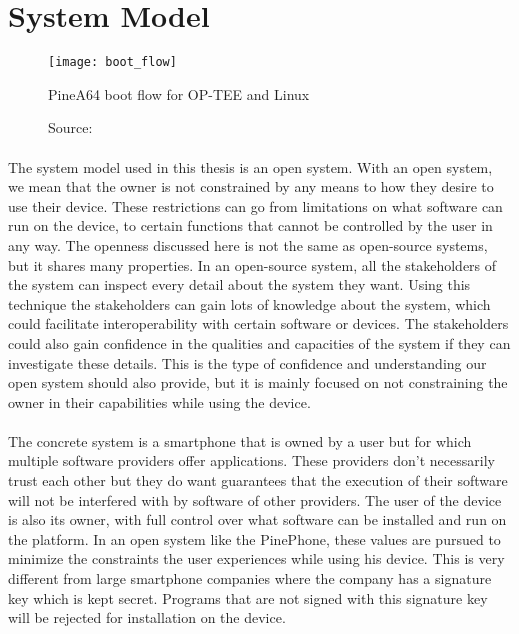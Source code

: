 \section{System Model}

\begin{figure}[h]
\centering
\texttt{[image: boot\_flow]}
\caption{PineA64 boot flow for OP-TEE and Linux}
\caption*{Source: \cite{blog}}
\label{boot}
\end{figure}

\paragraph*{}
The system model used in this thesis is an open system. With an open system, we mean that the owner is not constrained by any means to how they desire to use their device. These restrictions can go from limitations on what software can run on the device, to certain functions that cannot be controlled by the user in any way. The openness discussed here is not the same as open-source systems, but it shares many properties. In an open-source system, all the stakeholders of the system can inspect every detail about the system they want. Using this technique the stakeholders can gain lots of knowledge about the system, which could facilitate interoperability with certain software or devices. The stakeholders could also gain confidence in the qualities and capacities of the system if they can investigate these details. This is the type of confidence and understanding our open system should also provide, but it is mainly focused on not constraining the owner in their capabilities while using the device.

\paragraph*{}
The concrete system is a smartphone that is owned by a user but for which multiple software providers offer applications. These providers don't necessarily trust each other but they do want guarantees that the execution of their software will not be interfered with by software of other providers. The user of the device is also its owner, with full control over what software can be installed and run on the platform. In an open system like the PinePhone, these values are pursued to minimize the constraints the user experiences while using his device. This is very different from large smartphone companies where the company has a signature key which is kept secret. Programs that are not signed with this signature key will be rejected for installation on the device. 


